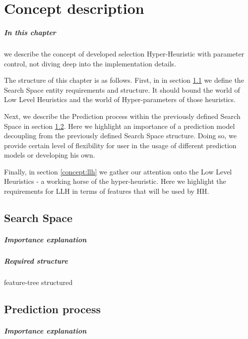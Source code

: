 \chapter{Concept description}
\paragraph{In this chapter} we describe the concept of developed selection Hyper-Heuristic with parameter control, not diving deep into the implementation details.

The structure of this chapter is as follows.
First, in in section \ref{concept:search space} we define the Search Space entity requirements and structure. 
It should bound the world of Low Level Heuristics and the world of Hyper-parameters of those heuristics.


Next, we describe the Prediction process within the previously defined Search Space in section \ref{concept:prediction}.
Here we highlight an importance of a prediction model decoupling from the previously defined Search Space structure.
Doing so, we provide certain level of flexibility for user in the usage of different prediction models or developing his own.


Finally, in section \ref{concept:llh} we gather our attention onto the Low Level Heuristics - a working horse of the hyper-heuristic.
Here we highlight the requirements for LLH in terms of features that will be used by HH.


\section{Search Space}\label{concept:search space}
\paragraph{Importance explanation}
\paragraph{Required structure} feature-tree structured



\section{Prediction process}\label{concept:prediction}
\paragraph{Importance explanation}
